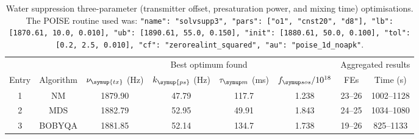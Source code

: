 \begin{table}
    \centering
    \begin{tabular}{cccccccc}
        \toprule
              &           & \multicolumn{4}{c}{Best optimum found} & \multicolumn{2}{c}{Aggregated results} \\
                            \cmidrule(lr){3-6}                       \cmidrule(lr){7-8}
        Entry & Algorithm & $\nu_{\symup{tx}}$ (\unit{\Hz}) & $k_{\symup{ps}}$ (\unit{\Hz}) & $\taum$ (\unit{\ms}) & $\fsos / 10^{18}$ & FEs    & Time (\unit{\s}) \\
        \midrule
        1     & NM        & 1879.90                    & 47.79          & 117.7              & 1.238                    & 23--26 & 1002--1128     \\
        2     & MDS       & 1882.79                    & 52.95          & 49.91              & 1.843                    & 24--25 & 1034--1080     \\
        3     & BOBYQA    & 1881.85                    & 52.14          & 134.7              & 1.738                    & 19--26 & 825--1133      \\
        \bottomrule
    \end{tabular}
    \caption[Water suppression three-parameter optimisations]{
        Water suppression three-parameter (transmitter offset, presaturation power, and mixing time) optimisations.
        The POISE routine used was: \texttt{{"name": "solvsupp3", "pars": ["o1", "cnst20", "d8"], "lb": [1870.61, 10.0, 0.010], "ub": [1890.61, 55.0, 0.150], "init": [1880.61, 50.0, 0.100], "tol": [0.2, 2.5, 0.010], "cf": "zerorealint_squared", "au": "poise_1d_noapk"}}.
    }
    \label{tbl:poise_solvsupp3p}
\end{table}

